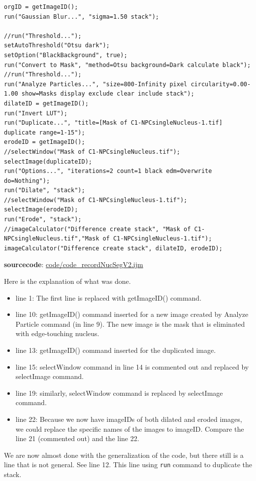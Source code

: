 \documentclass[11pt,a4paper,oneside]{report}
\newcommand{\ilcom}[1]{\texttt{\small#1}}
\begin{document}
\begin{lstlisting}[morekeywords={*, getImageID, selectImage, orgID, dilateID, erodeID}]
orgID = getImageID();
run("Gaussian Blur...", "sigma=1.50 stack");

//run("Threshold...");
setAutoThreshold("Otsu dark");
setOption("BlackBackground", true);
run("Convert to Mask", "method=Otsu background=Dark calculate black");
//run("Threshold...");
run("Analyze Particles...", "size=800-Infinity pixel circularity=0.00-1.00 show=Masks display exclude clear include stack");
dilateID = getImageID();
run("Invert LUT");
run("Duplicate...", "title=[Mask of C1-NPCsingleNucleus-1.tif] duplicate range=1-15");
erodeID = getImageID();
//selectWindow("Mask of C1-NPCsingleNucleus.tif");
selectImage(duplicateID);
run("Options...", "iterations=2 count=1 black edm=Overwrite do=Nothing");
run("Dilate", "stack");
//selectWindow("Mask of C1-NPCsingleNucleus-1.tif");
selectImage(erodeID);
run("Erode", "stack");
//imageCalculator("Difference create stack", "Mask of C1-NPCsingleNucleus.tif","Mask of C1-NPCsingleNucleus-1.tif");
imageCalculator("Difference create stack", dilateID, erodeID);

\end{lstlisting}
\textbf{sourcecode}: \href{http://www.example.com/contents}{code/code\_recordNucSegV2.ijm}

Here is the explanation of what was done. 
\begin{itemize}
  \item line 1: The first line is replaced with getImageID() command. 
  \item line 10: getImageID() command inserted for a new image created by Analyze Particle command (in line 9). The new image is the mask that is eliminated with edge-touching nucleus. 
  \item line 13: getImageID() command inserted for the duplicated image. 
  \item line 15: selectWindow command in line 14 is commented out and replaced by selectImage command. 
  \item line 19: similarly, selectWindow command is replaced by selectImage command. 
  \item line 22: Because we now have imageIDs of both dilated and eroded images, we could replace the specific names of the images to imageID. Compare the line 21 (commented out) and the line 22. 
\end{itemize}

We are now almost done with the generalization of the code, but there still is a line that is not general. See line 12. This line using \ilcom{run} command to duplicate the stack.
\end{document}
